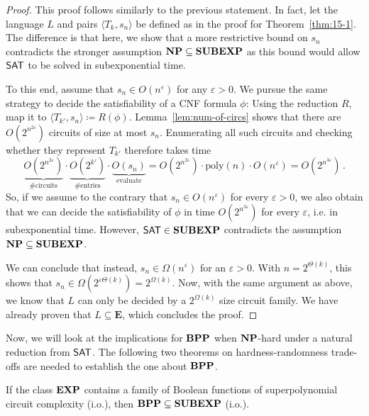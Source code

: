 \documentclass[11pt]{article}
\begin{document}
\begin{proof}
  This proof follows similarly to the previous statement.
  In fact, let the language $L$ and pairs $\langle T_k, s_n \rangle$ be defined
  as in the proof for Theorem~\ref{thm:15-1}.
  The difference is that here, we show that a more restrictive bound on
  $s_n$ contradicts the stronger assumption $\mathbf{NP} \subseteq \mathbf{SUBEXP}$ as
  this bound would allow $\mathsf{SAT}$ to be solved in subexponential time.

  To this end, assume that $s_n \in O(n^\varepsilon)$ for any
  $\varepsilon > 0$.
  We pursue the same strategy to decide the satisfiability of a CNF formula
  $\phi$: Using the reduction $R$, map it to
  $\langle T_{k'}, s_n \rangle \coloneqq R(\phi)$.
  Lemma~\ref{lem:num-of-circs} shows that there are
  $O(2^{n^{2 \varepsilon}})$ circuits of size at most $s_n$.
  Enumerating all such circuits and checking whether they represent $T_{k'}$
  therefore takes time
  \[
    \underbrace{O(2^{n^{2 \varepsilon}})}_{\textrm{\#circuits}} \cdot
    \underbrace{O(2^{k'})}_{\textrm{\#entries}} \cdot 
    \underbrace{O(s_n)}_{\textrm{evaluate}}
    =
    O(2^{n^{2 \varepsilon}}) \cdot
    \mathrm{poly}(n) \cdot
    O(n^\varepsilon)
    =
    O(2^{n^{3 \varepsilon}}) \,.
  \]
  So, if we assume to the contrary that
  $s_n \in O(n^\varepsilon)$ for every $\varepsilon > 0$,
  we also obtain that we can decide the satisfiability of $\phi$ in time
  $O(2^{n^{3 \varepsilon}})$ for every $\varepsilon$, i.e.
  in subexponential time.
  However, $\mathsf{SAT} \in \mathbf{SUBEXP}$
  contradicts the assumption $\mathbf{NP} \subseteq \mathbf{SUBEXP}$.

  We can conclude that instead, $s_n \in \Omega(n^\varepsilon)$
  for an $\varepsilon > 0$.
  With $n = 2^{\Theta(k)}$, this shows that
  $s_n \in \Omega(2^{\varepsilon \Theta(k)}) = 2^{\Omega(k)}$.
  Now, with the same argument as above, we know that $L$ can only be decided
  by a $2^{\Omega(k)}$ size circuit family. We have already proven that
  $L \subseteq \mathbf E$, which concludes the proof.
\end{proof}

Now, we will look at the implications for $\mathbf{BPP}$ when $\mathbf{NP}$-hard under a natural reduction from $\mathsf{SAT}$. The following two theorems on hardness-randomness trade-offs are needed to establish the one about $\mathbf{BPP}$.

\begin{theorem}
  \label{thm:bpp-in-subexp}
	If the class $\mathbf{EXP}$ contains a family of Boolean functions of superpolynomial circuit complexity (i.o.), then $\mathbf{BPP} \subseteq \mathbf{SUBEXP}$ (i.o.).
\end{theorem}
\end{document}
